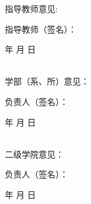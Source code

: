 指导教师意见:
  \vspace{4cm}
  \begin{flushright}
    指导教师（签名）：
    \coverunderline[3cm]{}
    \qquad \qquad

    年 \quad 月 \quad 日
  \end{flushright}
  \vspace{2cm}
\\ \hline
学部（系、所）意见：
  \vspace{2cm}
  \begin{flushright}
    负责人（签名）：
    \coverunderline[3cm]{}
    \qquad \qquad

    年 \quad 月 \quad 日
  \end{flushright}
  \vspace{2cm}
\\ \hline
二级学院意见：
  \vspace{2cm}
  \begin{flushright}
    负责人（签名）：
    \coverunderline[3cm]{}
    \qquad \qquad

    年 \quad 月 \quad 日
  \end{flushright}
  \vspace{2cm}
